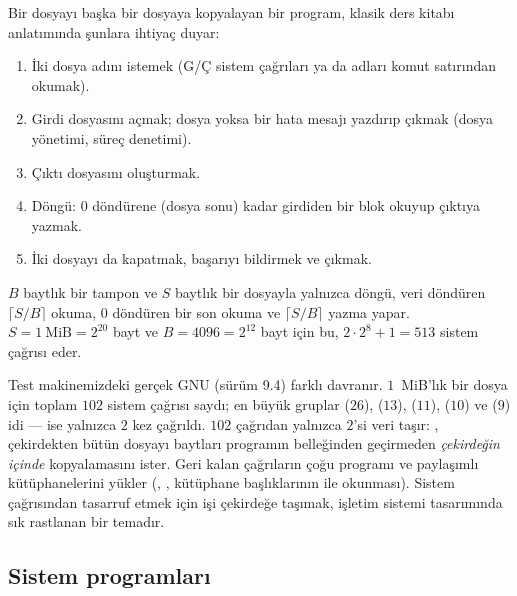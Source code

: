 \begin{example}
Bir dosyayı başka bir dosyaya kopyalayan bir program, klasik ders kitabı anlatımında şunlara ihtiyaç duyar:
\begin{enumerate}[leftmargin=1.4em]
  \item İki dosya adını istemek (G/Ç sistem çağrıları ya da adları komut satırından okumak).
  \item Girdi dosyasını açmak; dosya yoksa bir hata mesajı yazdırıp çıkmak (dosya yönetimi, süreç denetimi).
  \item Çıktı dosyasını oluşturmak.
  \item Döngü:  $0$ döndürene (dosya sonu) kadar girdiden bir blok okuyup çıktıya yazmak.
  \item İki dosyayı da kapatmak, başarıyı bildirmek ve çıkmak.
\end{enumerate}
$B$ baytlık bir tampon ve $S$ baytlık bir dosyayla yalnızca döngü, veri döndüren $\lceil S/B \rceil$ okuma, $0$ döndüren bir son okuma ve $\lceil S/B \rceil$ yazma yapar. $S = 1\ \text{MiB} = 2^{20}$ bayt ve $B = 4096 = 2^{12}$ bayt için bu, $2\cdot 2^{8} + 1 = 513$ sistem çağrısı eder.

Test makinemizdeki gerçek GNU  (sürüm 9.4) farklı davranır. $1$~MiB'lık bir dosya için  toplam $102$ sistem çağrısı saydı; en büyük gruplar  ($26$),  ($13$),  ($11$),  ($10$) ve  ($9$) idi ---  ise yalnızca $2$ kez çağrıldı.
$102$ çağrıdan yalnızca $2$'si veri taşır: , çekirdekten bütün dosyayı baytları programın belleğinden geçirmeden \emph{çekirdeğin içinde} kopyalamasını ister. Geri kalan çağrıların çoğu programı ve paylaşımlı kütüphanelerini yükler (, , kütüphane başlıklarının  ile okunması). Sistem çağrısından tasarruf etmek için işi çekirdeğe taşımak, işletim sistemi tasarımında sık rastlanan bir temadır.
\end{example}

\subsection{Sistem programları}


